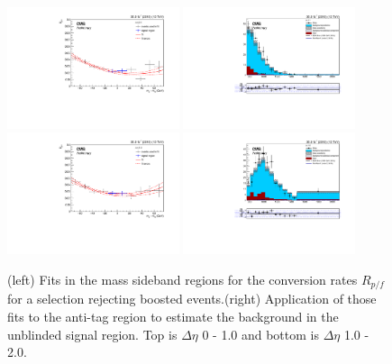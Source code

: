 \begin{figure}[h]
\centering
\includegraphics[width=0.45\textwidth]{F5/HH4b2p1SR_Fit_NRv1_unB1_boost_dEta1.pdf}
\includegraphics[width=0.45\textwidth]{F5/HH4b2p1_Plot_NRv1_unB1_boost_dEta1.pdf}\\
\includegraphics[width=0.45\textwidth]{F5/HH4b2p1SR_Fit_NRv1_unB1_boost_dEta2.pdf}
\includegraphics[width=0.45\textwidth]{F5/HH4b2p1_Plot_NRv1_unB1_boost_dEta2.pdf}
\caption{(left) Fits in the mass sideband regions for the conversion rates $R_{p/f}$ for a selection rejecting boosted events.(right) Application of those fits to the anti-tag region to estimate the background in the unblinded signal region. Top is $\Delta\eta$ 0 - 1.0 and bottom is $\Delta\eta$ 1.0 - 2.0.}
\label{fig:databoost}
\end{figure}

